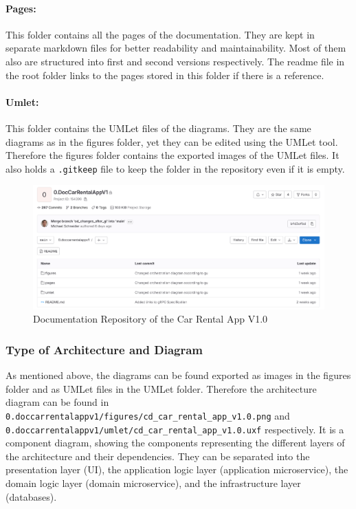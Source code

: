 \paragraph*{Pages:}
This folder contains all the pages of the documentation.
They are kept in separate markdown files for better readability and maintainability.
Most of them also are structured into first and second versions respectively.
The readme file in the root folder links to the pages stored in this folder if there is a reference.
\paragraph*{Umlet:}
This folder contains the UMLet files of the diagrams.
They are the same diagrams as in the figures folder, yet they can be edited using the UMLet tool.
Therefore the figures folder contains the exported images of the UMLet files.
It also holds a \texttt{.gitkeep} file to keep the folder in the repository even if it is empty.

\begin{figure}
    \centering
    \includegraphics[width=\textwidth]{figures/microservices/introduction/ms_intro_docRepo.png}
    \caption{Documentation Repository of the Car Rental App V1.0}
    \label{fig:doc_repo_car_rental_app_v1}
\end{figure}

\subsubsection*{Type of Architecture and Diagram}
As mentioned above, the diagrams can be found exported as images in the figures folder and as UMLet files in the UMLet folder.
Therefore the architecture diagram can be found in \texttt{0.doccarrentalappv1/figures/cd\_car\_rental\_app\_v1.0.png} and \hfill \linebreak \texttt{0.doccarrentalappv1/umlet/cd\_car\_rental\_app\_v1.0.uxf} respectively.
It is a component diagram, showing the components representing the different layers of the architecture and their dependencies.
They can be separated into the presentation layer (UI), the application logic layer (application microservice), the domain logic layer (domain microservice), and the infrastructure layer (databases).


